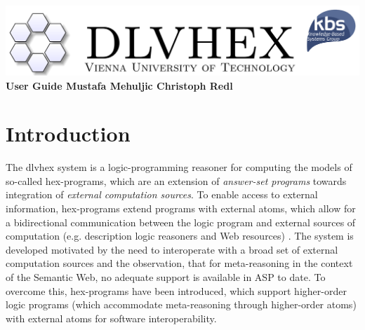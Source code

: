 \documentclass[14pt,a4paper, titlepage]{article}
\begin{document}
\setcounter{page}{3}
\newcommand{\dlvhex}{{\sc dlvhex}}
\newcommand{\hex}{{\sc hex}}
\setcounter{secnumdepth}{4} %
\setcounter{tocdepth}{4}    %

\newtheorem{exmp}{Example}[section]


\begin{titlepage}
    \centering
    \vfill
    \includegraphics[scale=1.2]{biglogo_whitebg}
    \vfill
    {\bfseries\Large
        User Guide
        \vskip4cm
        Mustafa Mehuljic \vskip1cm Christoph Redl
    }    
    
\end{titlepage}

\begin{abstract}
This document provides a user guide for the Answer Set 
Programming (ASP) system called \dlvhex{} developed at 
Vienna University of Technology. ASP is a declarative 
problem solving paradigm, rooted in logic programming and 
nonmonotonic reasoning, which has been gaining increasing 
attention during the last years. The \dlvhex{} system is a 
reasoner for computing the models of so-called \hex{}-programs, which are an extension of \emph{answer-set 
programs} towards integration of \emph{external computation 
sources}. This guide aims at enabling users of this system 
to interoperate with a broad set of external computation 
sources. The guide refers to release 2.4.     
\end{abstract}

\tableofcontents
\newpage

\section{Introduction} %
\label{sec:intro}
The \dlvhex{} system is a logic-programming reasoner for 
computing the models of so-called \hex{}-programs, which 
are an extension of \emph{answer-set programs} towards 
integration of \emph{external computation sources}. To 
enable access to external information, \hex{}-programs 
extend programs with external atoms, which allow for a 
bidirectional communication between the logic program and 
external sources of computation (e.g. description logic 
reasoners and Web resources) \cite{extatoms}. The system is 
developed motivated by the need to interoperate with a 
broad set of external computation sources and the 
observation, that for meta-reasoning in the context of the 
Semantic Web, no adequate support is available in ASP to 
date. To overcome this, \hex{}-programs have been 
introduced, which support higher-order logic programs 
(which accommodate meta-reasoning through higher-order 
atoms) with external atoms for software interoperability.
\end{document}
